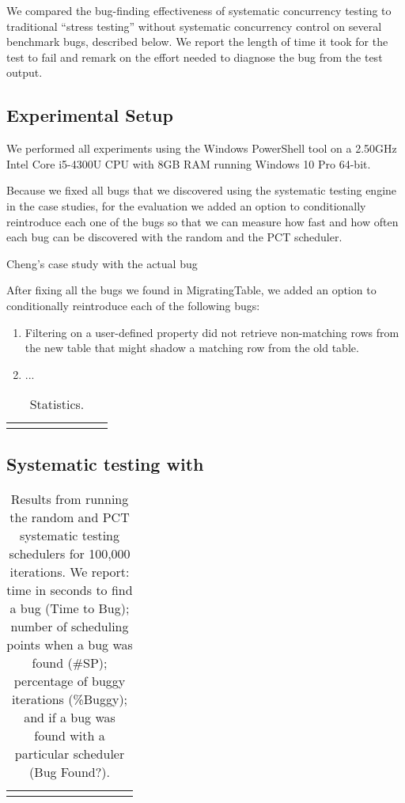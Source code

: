 We compared the bug-finding effectiveness of \psharp systematic concurrency testing to traditional ``stress testing'' without systematic concurrency control on several benchmark bugs, described below.  We report the length of time it took for the test to fail and remark on the effort needed to diagnose the bug from the test output. 

\subsection{Experimental Setup}

We performed all experiments using the Windows PowerShell tool on a 2.50GHz Intel Core i5-4300U CPU with 8GB RAM running Windows 10 Pro 64-bit.

Because we fixed all bugs that we discovered using the \psharp systematic testing engine in the case studies, for the evaluation we added an option to conditionally reintroduce each one of the bugs so that we can measure how fast and how often each bug can be discovered with the \psharp random and the PCT scheduler.

Cheng's case study with the actual bug

After fixing all the bugs we found in MigratingTable, we added an option to conditionally reintroduce each of the following bugs:
\begin{enumerate}
\item Filtering on a user-defined property did not retrieve non-matching rows from the new table that might shadow a matching row from the old table.
\item ...
\end{enumerate}

\newcommand{\colspacing}{\hspace{1.8em}}
\begin{table}[t]
\small
\centering
\setlength{\tabcolsep}{0.3em}
\label{tab:stats}
\begin{tabular}{l rrrrr rr}
\centering

\end{tabular}
\caption{Statistics.}
\end{table}

\subsection{Systematic testing with \psharp}

\setlength{\tabcolsep}{.52em}
\begin{table*}[t]
\small
\centering
\begin{tabular}{rl rrrr rrrr}
\centering

\end{tabular}
\caption{Results from running the \psharp random and PCT systematic testing schedulers for 100,000 iterations. We report: time in seconds to find a bug (Time to Bug); number of scheduling points when a bug was found (\#SP); percentage of buggy iterations (\%Buggy); and if a bug was found with a particular scheduler (Bug Found?).}
\label{tab:testing}
\end{table*}

